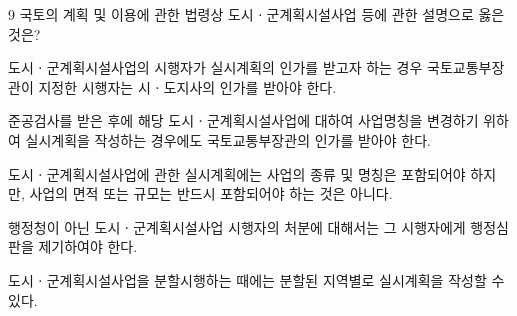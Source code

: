 \begin{question}{9}
국토의 계획 및 이용에 관한 법령상 도시ㆍ군계획시설사업 등에 관한 설명으로 옳은 것은?
\begin{choices}
  \item 도시ㆍ군계획시설사업의 시행자가 실시계획의 인가를 받고자 하는 경우 국토교통부장관이 지정한 시행자는 시ㆍ도지사의 인가를 받아야 한다.
  \item 준공검사를 받은 후에 해당 도시ㆍ군계획시설사업에 대하여 사업명칭을 변경하기 위하여 실시계획을 작성하는 경우에도 국토교통부장관의 인가를 받아야 한다.
  \item 도시ㆍ군계획시설사업에 관한 실시계획에는 사업의 종류 및 명칭은 포함되어야 하지만, 사업의 면적 또는 규모는 반드시 포함되어야 하는 것은 아니다.
  \item 행정청이 아닌 도시ㆍ군계획시설사업 시행자의 처분에 대해서는 그 시행자에게 행정심판을 제기하여야 한다.
  \item 도시ㆍ군계획시설사업을 분할시행하는 때에는 분할된 지역별로 실시계획을 작성할 수 있다.
\end{choices}
\end{question}
